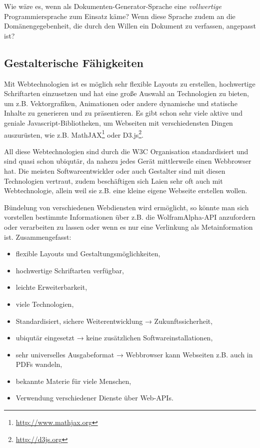 Wie wäre es, wenn als Dokumenten-\-Generator-\-Sprache eine \emph{vollwertige}
Programmiersprache zum Einsatz käme? Wenn diese Sprache zudem an die
Domänen\-gege\-ben\-heit, die durch den Willen ein Dokument zu verfassen,
angepasst ist?

\subsection{Gestalterische Fähigkeiten}

Mit Webtechnologien ist es möglich sehr flexible Layouts zu erstellen,
hochwertige Schriftarten einzusetzen und hat eine große Auswahl an
Technologien zu bieten, um z.B. Vektorgrafiken, Animationen oder
andere dynamische und statische Inhalte zu generieren und zu
präsentieren. Es gibt schon sehr viele aktive und geniale Javascript-Bibliotheken,
um Webseiten mit verschiedensten Dingen auszurüsten,
wie z.B. MathJAX\footnote{\url{http://www.mathjax.org}} oder
D3.js\footnote{\url{http://d3js.org}}.

All diese Webtechnologien sind durch die W3C Organisation standardisiert
und sind quasi schon ubiqutär, da nahezu jedes Gerät mittlerweile einen
Webbrowser hat. Die meisten Softwareentwickler oder auch
Gestalter sind mit diesen Technologien vertraut, zudem beschäftigen sich
Laien sehr oft auch mit Webtechnologie, allein weil sie z.B. eine kleine
eigene Webseite erstellen wollen.

Bündelung von verschiedenen Webdiensten wird ermöglicht, so könnte man sich
vorstellen bestimmte Informationen über z.B. die WolframAlpha-API
anzufordern oder verarbeiten zu lassen oder wenn es nur eine Verlinkung
als Metainformation ist. Zusammengefasst:

\begin{itemize}
  \item flexible Layouts und Gestaltungsmöglichkeiten,
  \item hochwertige Schriftarten verfügbar,
  \item leichte Erweiterbarkeit,
  \item viele Technologien,
  \item Standardisiert, sichere Weiterentwicklung → Zukunftssicherheit,
  \item ubiqutär eingesetzt → keine zusätzlichen Softwareinstallationen,
  \item sehr universelles Ausgabeformat → Webbrowser
        kann Webseiten z.B. auch in PDFs wandeln,
  \item bekannte Materie für viele Menschen,
  \item Verwendung verschiedener Dienste über Web-APIs.
\end{itemize}

